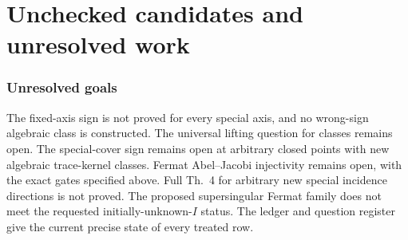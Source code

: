\documentclass[11pt]{article}
\theoremstyle{remark}\newtheorem{remark}[theorem]{Remark}
\begin{document}

\part{Unchecked candidates and unresolved work}

\section{Unresolved goals}
The fixed-axis sign is not proved for every special axis, and no
wrong-sign algebraic class is constructed. The universal lifting
question for classes remains open. The special-cover sign remains
open at arbitrary closed points with new algebraic trace-kernel
classes. Fermat Abel--Jacobi injectivity remains open, with the
exact gates specified above. Full Th.~4 for arbitrary new special
incidence directions is not proved. The proposed supersingular
Fermat family does not meet the requested initially-unknown-$I$
status. The ledger and question register give the current precise
state of every treated row.
\end{document}
